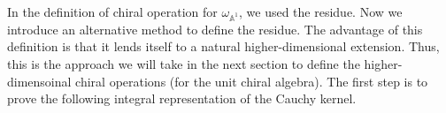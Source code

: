 \documentclass[11pt]{amsart}
\theoremstyle{definition}
\theoremstyle{remark}
\numberwithin{equation}{section}
\begin{document}
In the definition of chiral operation for $\omega_{\mathbb{A}^{1}}$, we used the residue.
Now we introduce an alternative method to define the residue.
The advantage of this definition is that it lends itself to a natural higher-dimensional extension.
Thus, this is the approach we will take in the next section to define the higher-dimensoinal chiral operations (for the
unit chiral algebra).
The first step is to prove the following integral representation of the Cauchy kernel.
\end{document}
